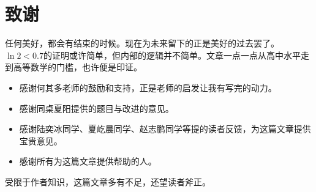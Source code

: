 \documentclass[12pt]{article}
\theoremstyle{definition}
\theoremstyle{plain}
\theoremstyle{definition}
\begin{document}

\section*{致谢}

任何美好，都会有结束的时候。现在为未来留下的正是美好的过去罢了。
\(\ln 2 < 0.7\)的证明或许简单，但内部的逻辑并不简单。文章一点一点从高中水平走到高等数学的门槛，也许便是印证。

\begin{itemize}
    \item 感谢何其多老师的鼓励和支持，正是老师的启发让我有写完的动力。
    \item 感谢同桌夏阳提供的题目与改进的意见。
    \item 感谢陆奕冰同学、夏屹晨同学、赵志鹏同学等提的读者反馈，为这篇文章提供宝贵意见。
    \item 感谢所有为这篇文章提供帮助的人。
\end{itemize}

受限于作者知识，这篇文章多有不足，还望读者斧正。
\end{document}
